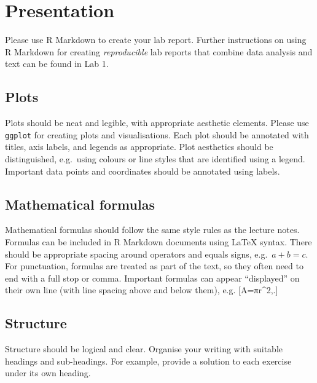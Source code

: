 \documentclass[
  a4paper,
  oneside]{book}
\theoremstyle{definition}
\theoremstyle{definition}
\theoremstyle{definition}
\theoremstyle{plain}
\theoremstyle{remark}
\begin{document}
\section*{Presentation}\label{w-present}


Please use R Markdown to create your lab report. Further instructions on
using R Markdown for creating \emph{reproducible} lab reports that
combine data analysis and text can be found in Lab 1.

\subsection*{Plots}\label{w-plots}

Plots should be neat and legible, with appropriate aesthetic elements.
Please use \texttt{ggplot} for creating plots and visualisations. Each
plot should be annotated with titles, axis labels, and legends as
appropriate. Plot aesthetics should be distinguished, e.g.~using colours
or line styles that are identified using a legend. Important data points
and coordinates should be annotated using labels.

\subsection*{Mathematical formulas}\label{w-math}

Mathematical formulas should follow the same style rules as the lecture
notes. Formulas can be included in R Markdown documents using \LaTeX{}
syntax. There should be appropriate spacing around operators and equals
signs, e.g.~\(a + b = c\). For punctuation, formulas are treated as part
of the text, so they often need to end with a full stop or comma.
Important formulas can appear ``displayed'' on their own line (with line
spacing above and below them), e.g. {[}A=πr\^{}2,.{]}

\subsection*{Structure}\label{w-structure}

Structure should be logical and clear. Organise your writing with
suitable headings and sub-headings. For example, provide a solution to
each exercise under its own heading.
\end{document}
